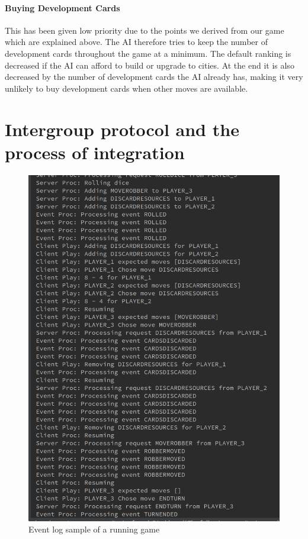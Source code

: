 \documentclass[a4paper,doc,draftfirst]{apa6}
\begin{document}
\paragraph{Buying Development Cards}
	This has been given low priority due to the points we derived from our game which are explained above. The AI therefore tries to keep the number of development cards throughout the game at a minimum. The default ranking is decreased if the AI can afford to build or upgrade to cities. At the end it is also decreased by the number of development cards the AI already has, making it very unlikely to buy development cards when other moves are available.


\section{Intergroup protocol and the process of integration}
\begin{figure}[hbtp]
      \includegraphics[width=\textwidth]{eventlog}
      \caption{Event log sample of a running game}
\end{figure}
\end{document}
